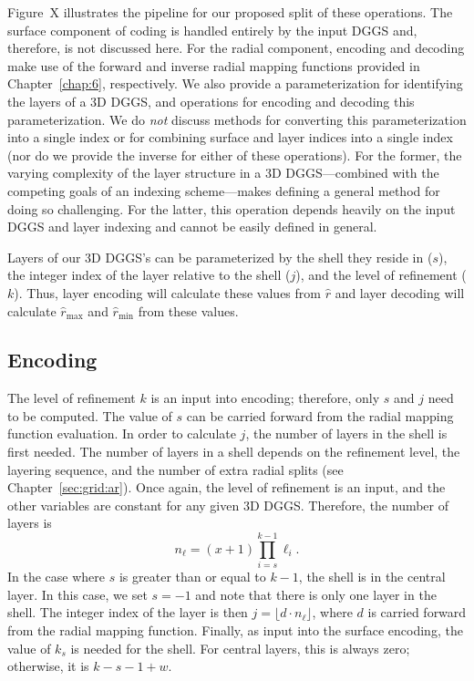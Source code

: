 Figure~X illustrates the pipeline for our proposed split of these operations.
The surface component of coding is handled entirely by the input DGGS and, therefore, is not discussed here.
For the radial component, encoding and decoding make use of the forward and inverse radial mapping functions provided in Chapter~\ref{chap:6}, respectively.
We also provide a parameterization for identifying the layers of a 3D DGGS, and operations for encoding and decoding this parameterization.
We do \textit{not} discuss methods for converting this parameterization into a single index or for combining surface and layer indices into a single index (nor do we provide the inverse for either of these operations).
For the former, the varying complexity of the layer structure in a 3D DGGS---combined with the competing goals of an indexing scheme---makes defining a general method for doing so challenging.
For the latter, this operation depends heavily on the input DGGS and layer indexing and cannot be easily defined in general.


Layers of our 3D DGGS's can be parameterized by the shell they reside in ($s$), the integer index of the layer relative to the shell ($j$), and the level of refinement ($k$).
Thus, layer encoding will calculate these values from $\hat{r}$ and layer decoding will calculate $\hat{r}_\mathrm{max}$ and $\hat{r}_\mathrm{min}$ from these values.


\subsection{Encoding}
The level of refinement $k$ is an input into encoding; therefore, only $s$ and $j$ need to be computed.
The value of $s$ can be carried forward from the radial mapping function evaluation.
In order to calculate $j$, the number of layers in the shell is first needed.
The number of layers in a shell depends on the refinement level, the layering sequence, and the number of extra radial splits (see Chapter~\ref{sec:grid:ar}).
Once again, the level of refinement is an input, and the other variables are constant for any given 3D DGGS.
Therefore, the number of layers is
%
\begin{equation*}
n_\ell = \left( x+1 \right) \prod_{i = s}^{k - 1} \ell_i.
\end{equation*}
%
In the case where $s$ is greater than or equal to $k-1$, the shell is in the central layer.
In this case, we set $s = -1$ and note that there is only one layer in the shell.
The integer index of the layer is then $j = \lfloor d \cdot n_\ell \rfloor$, where $d$ is carried forward from the radial mapping function.
Finally, as input into the surface encoding, the value of $k_s$ is needed for the shell.
For central layers, this is always zero; otherwise, it is $k - s - 1 + w$.


